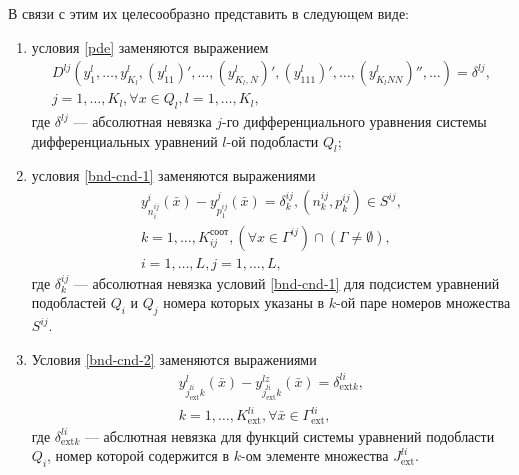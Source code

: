 \documentclass[a4paper,12pt]{article}
\begin{document}
В связи с этим их целесообразно представить в следующем виде:
\begin{enumerate}[label=\alph*)]
    \item условия \eqref{pde} заменяются выражением
        \begin{equation}
            \begin{array}{cc}
                D^{lj}(y^l_1,\ldots,y^l_{K_l}, (y^l_{11})',\ldots,
                (y^l_{K_l,N})', (y^l_{111})',\ldots,
                (y^l_{K_lNN})'',\ldots) = \delta^{lj},\\
                j = 1,\ldots,K_l, \forall x \in Q_l, l=1,\ldots, K_l,
            \end{array}
            \label{pde_upd}
        \end{equation}
        где $\delta^{lj}$ --- абсолютная невязка $j$-го дифференциального
        уравнения системы дифференциальных уравнений $l$-ой подобласти
        $Q_l$;
    \item условия \eqref{bnd-cnd-1} заменяются выражениями
        \begin{equation}
            \begin{array}{cc}
                y^i_{n^{ij}_i}(\bar{x})-y^j_{p^{ij}_1}(\bar{x})=
                \delta^{ij}_k,(n^{ij}_k,p^{ij}_k) \in S^{ij},\\
                k=1,\ldots,K^{соот}_{ij},
                \left( \forall x \in \Gamma^{ij} \right) \cap 
                \left( \Gamma \neq \emptyset \right),\\
                i=1,\ldots,L,j=1,\ldots,L,
            \end{array}
            \label{bnd-cnd-upd-1}
        \end{equation}
        где $\delta^{ij}_k$ --- абсолютная невязка условий 
        \eqref{bnd-cnd-1} для подсистем уравнений подобластей $Q_i$ и 
        $Q_j$ номера которых указаны в $k$-ой паре номеров множества 
        $S^{ij}$.
    \item Условия \eqref{bnd-cnd-2} заменяются выражениями
        \begin{equation}
            \begin{array}{cc}
                y^l_{j^{li}_{\text{ext} }k}(\bar{x})-
                y^{lz}_{j^{li}_{\text{ext} }k}(\bar{x})=\delta^{li}_{\text{ext} k},\\
                k=1,\ldots,K^{li}_{\text{ext}},\forall \bar{x} \in 
                \Gamma^{li}_{\text{ext}},
            \end{array}
            \label{bnd-cnd-upd-2}
        \end{equation}
        где $\delta^{li}_{\text{ext} k}$ --- абслютная невязка для функций 
        системы уравнений подобласти $Q_i$, номер которой содержится
        в $k$-ом элементе множества $J^{li}_{\text{ext}}$.
\end{enumerate}
\end{document}
